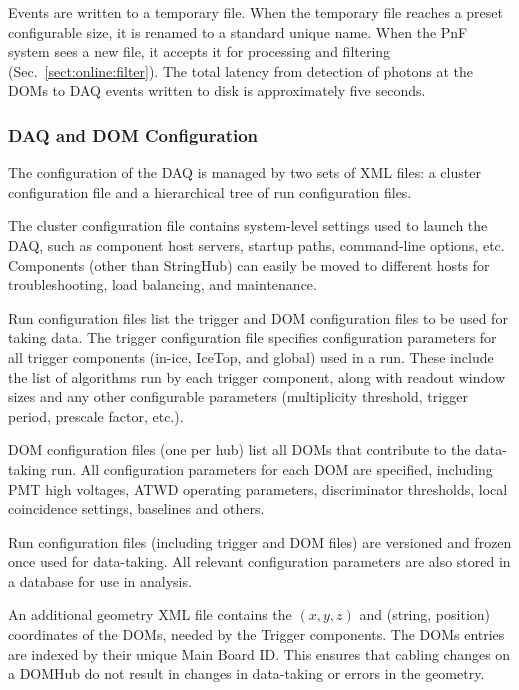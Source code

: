 Events are written to a temporary file.  When the temporary file
reaches a preset configurable size, it is renamed to a standard unique name.  When the PnF
system sees a new file, it accepts it for processing and filtering
(Sec.~\ref{sect:online:filter}).  The total latency from detection of
photons at the DOMs to DAQ events written to disk is approximately five
seconds. 

\subsubsection{\label{sect:online:daqdomconfig}DAQ and DOM Configuration}

The configuration of the DAQ is managed by two sets of XML files: a cluster
configuration file and a hierarchical tree of run configuration files.

The cluster configuration file contains system-level settings used to
launch the DAQ, such as component host servers, startup paths, command-line
options, etc.  Components (other than StringHub) can easily be moved to
different hosts for troubleshooting, load balancing, and maintenance.

Run configuration files list the trigger and DOM configuration files to be
used for taking data.  The trigger configuration file specifies
configuration parameters for all 
trigger components (in-ice, IceTop, and global) used in a run.  These
include the list of algorithms run by each trigger component, along with
readout window sizes and any other configurable parameters (multiplicity
threshold, trigger period, prescale factor, etc.).

DOM configuration files (one per hub) list all DOMs that contribute to
the data-taking run.  All configuration parameters for each DOM are
specified, including PMT high voltages, ATWD operating parameters,
discriminator thresholds, local coincidence settings, baselines and others.

Run configuration files (including trigger and DOM files) are versioned and
frozen once used for data-taking.  All relevant configuration parameters
are also stored in a database for use in analysis.

An additional geometry XML file contains the $(x,y,z)$ and (string,
position) coordinates of the DOMs, needed by the Trigger components.  The
DOMs entries are indexed by their unique Main Board ID.  This ensures that cabling changes
on a DOMHub do not result in changes in data-taking or errors in the geometry.

